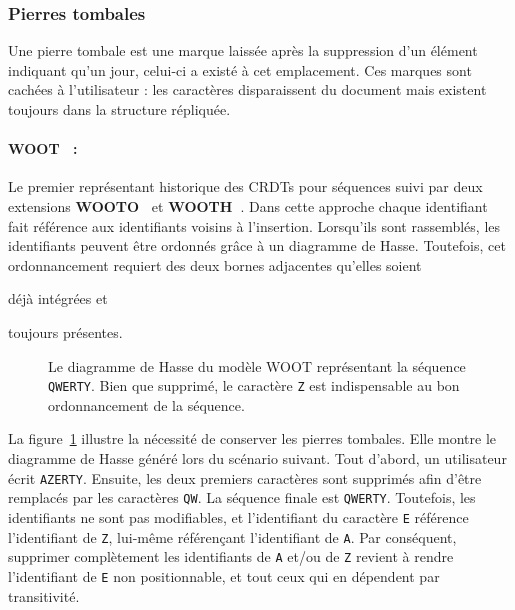 \subsubsection{Pierres tombales}
\label{repl:subsubsec:tombstones}

Une \og pierre tombale \fg est une marque laissée après la suppression d'un
élément indiquant qu'un jour, celui-ci a existé à cet emplacement. Ces marques
sont cachées à l'utilisateur : les caractères disparaissent du document mais
existent toujours dans la structure répliquée.


\paragraph{WOOT~\cite{oster2006data} :} Le premier représentant historique des
CRDTs pour séquences suivi par deux extensions
\textbf{WOOTO~\cite{weiss2007wooki}} et
\textbf{WOOTH~\cite{ahmed2011evaluating}}. Dans cette approche chaque
identifiant fait référence aux identifiants voisins à l'insertion.  Lorsqu'ils
sont rassemblés, les identifiants peuvent être ordonnés grâce à un diagramme de
Hasse. Toutefois, cet ordonnancement requiert des deux bornes adjacentes
qu'elles soient
\begin{inparaenum}[(i)]
\item déjà intégrées et
\item toujours présentes.
\end{inparaenum}

\begin{figure}
  \centering
  
  \caption[Diagramme de Hasse dans WOOT]
  {\label{repl:fig:wootexample}Le diagramme de Hasse du modèle WOOT représentant
    la séquence \texttt{QWERTY}. Bien que supprimé, le caractère \texttt{Z} est
    indispensable au bon ordonnancement de la séquence.}
\end{figure}

\noindent La figure~\ref{repl:fig:wootexample} illustre la nécessité de
conserver les pierres tombales. Elle montre le diagramme de Hasse généré lors du
scénario suivant. Tout d'abord, un utilisateur écrit \texttt{AZERTY}. Ensuite,
les deux premiers caractères sont supprimés afin d'être remplacés par les
caractères \texttt{QW}. La séquence finale est \texttt{QWERTY}. Toutefois, les
identifiants ne sont pas modifiables, et l'identifiant du caractère \texttt{E}
référence l'identifiant de \texttt{Z}, lui-même référençant l'identifiant de
\texttt{A}. Par conséquent, supprimer complètement les identifiants de
\texttt{A} et/ou de \texttt{Z} revient à rendre l'identifiant de \texttt{E} non
positionnable, et tout ceux qui en dépendent par transitivité.

